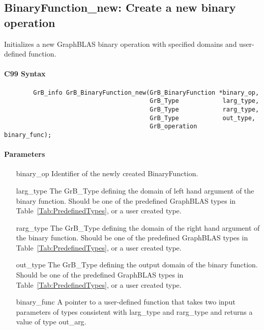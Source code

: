 \subsection{{\sf BinaryFunction\_new}: Create a new binary operation}

Initializes a new GraphBLAS binary operation with specified domains and user-defined function.

\paragraph{C99 Syntax}

\begin{verbatim}
        GrB_info GrB_BinaryFunction_new(GrB_BinaryFunction *binary_op,
                                        GrB_Type            larg_type,
                                        GrB_Type            rarg_type,
                                        GrB_Type            out_type,
                                        GrB_operation       binary_func);
\end{verbatim}

\paragraph{Parameters}

\begin{itemize}[leftmargin=1.1in]
    \item[{\sf binary\_op}]      Identifier of the newly created BinaryFunction.
    \item[{\sf larg\_type}]      The {\sf GrB\_Type} defining the domain of left hand argument of
    the binary function. Should be one of the predefined
    GraphBLAS types in Table~\ref{Tab:PredefinedTypes}, or a user created type.
    \item[{\sf rarg\_type}]      The {\sf GrB\_Type} defining the domain of the right hand 
    argument of the binary function. Should be one of the predefined
    GraphBLAS types in Table~\ref{Tab:PredefinedTypes}, or a user created type.
    \item[{\sf out\_type}]       The {\sf GrB\_Type} defining the output domain of the binary
    function. Should be one of the predefined
    GraphBLAS types in Table~\ref{Tab:PredefinedTypes}, or a user created type.
    \item[{\sf binary\_func}]    A pointer to a user-defined function that takes two input 
    parameters of types consistent with {\sf larg\_type} and {\sf rarg\_type} and returns a 
    value of type {\sf out\_arg}.
\end{itemize}


